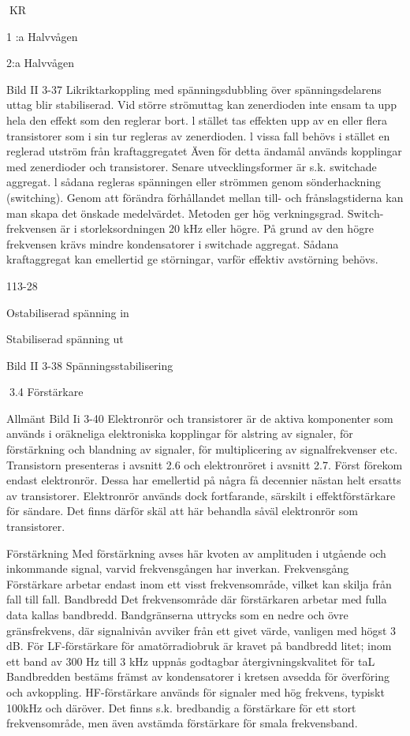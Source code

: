 \documentclass[a4paper,twoside,twocolumn,openright]{book}
\begin{document}
{{{{{{{KR

1 :a Halvvågen

2:a Halvvågen

Bild II 3-37 Likriktarkoppling med spänningsdubbling
över spänningsdelarens uttag blir stabiliserad. Vid större strömuttag kan zenerdioden
inte ensam ta upp hela den effekt som den
reglerar bort. l stället tas effekten upp av en
eller flera transistorer som i sin tur regleras
av zenerdioden.
l vissa fall behövs i stället en reglerad
utström från kraftaggregatet Även för detta
ändamål används kopplingar med zenerdioder och transistorer.
Senare utvecklingsformer är s.k. switchade aggregat. l sådana regleras spänningen eller strömmen genom sönderhackning (switching). Genom att förändra förhållandet mellan till- och frånslagstiderna kan
man skapa det önskade medelvärdet. Metoden ger hög verkningsgrad. Switch-frekvensen är i storleksordningen 20 kHz eller högre. På grund av den högre frekvensen
krävs mindre kondensatorer i switchade
aggregat. Sådana kraftaggregat kan emellertid ge störningar, varför effektiv avstörning behövs.

113-28

Ostabiliserad
spänning in

Stabiliserad
spänning ut

Bild II 3-38 Spänningsstabilisering

3.4 Förstärkare

Allmänt
Bild Ii 3-40
Elektronrör och transistorer är de aktiva komponenter som används i oräkneliga elektroniska kopplingar för alstring av signaler, för
förstärkning och blandning av signaler, för
multiplicering av signalfrekvenser etc.
Transistorn presenteras i avsnitt 2.6 och
elektronröret i avsnitt 2.7.
Först förekom endast elektronrör. Dessa
har emellertid på några få decennier nästan
helt ersatts av transistorer. Elektronrör används dock fortfarande, särskilt i effektförstärkare för sändare. Det finns därför skäl att
här behandla såväl elektronrör som transistorer.

Förstärkning
Med förstärkning avses här kvoten av amplituden i utgående och inkommande signal,
varvid frekvensgången har inverkan.
Frekvensgång
Förstärkare arbetar endast inom ett visst
frekvensområde, vilket kan skilja från fall till
fall.
Bandbredd
Det frekvensområde där förstärkaren arbetar med fulla data kallas bandbredd. Bandgränserna uttrycks som en nedre och övre
gränsfrekvens, där signalnivån avviker från
ett givet värde, vanligen med högst 3 dB.
För LF-förstärkare för amatörradiobruk
är kravet på bandbredd litet; inom ett band
av 300 Hz till 3 kHz uppnås godtagbar
återgivningskvalitet för taL Bandbredden
bestäms främst av kondensatorer i kretsen
avsedda för överföring och avkoppling.
HF-förstärkare används för signaler med
hög frekvens, typiskt 100kHz och däröver.
Det finns s.k. bredbandig a förstärkare för ett
stort frekvensområde, men även avstämda
förstärkare för smala frekvensband.

}}}}}}}
\end{document}

